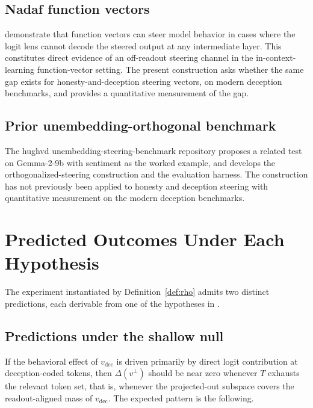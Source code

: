 \documentclass[11pt,letterpaper]{article}
\theoremstyle{plain}
\theoremstyle{definition}
\newcommand{\1}{\mathbf{1}}
\newcommand{\vdec}{v_{\text{dec}}}
\newcommand{\vperp}{v^{\perp}}
\begin{document}
\subsection{Nadaf function vectors}

\cite{nadaf2026function} demonstrate that function vectors can steer model behavior in cases where the logit lens cannot decode the steered output at any intermediate layer. This constitutes direct evidence of an off-readout steering channel in the in-context-learning function-vector setting. The present construction asks whether the same gap exists for honesty-and-deception steering vectors, on modern deception benchmarks, and provides a quantitative measurement of the gap.

\subsection{Prior unembedding-orthogonal benchmark}

The hughvd unembedding-steering-benchmark repository \cite{hughvd2024benchmark} proposes a related test on Gemma-2-9b with sentiment as the worked example, and develops the orthogonalized-steering construction and the evaluation harness. The construction has not previously been applied to honesty and deception steering with quantitative measurement on the modern deception benchmarks.

\section{Predicted Outcomes Under Each Hypothesis}\label{sec:predictions}

The experiment instantiated by Definition~\ref{def:rho} admits two distinct predictions, each derivable from one of the hypotheses in .

\subsection{Predictions under the shallow null}

If the behavioral effect of $\vdec$ is driven primarily by direct logit contribution at deception-coded tokens, then $\Delta(\vperp)$ should be near zero whenever $T$ exhausts the relevant token set, that is, whenever the projected-out subspace covers the readout-aligned mass of $\vdec$. The expected pattern is the following.
\end{document}

